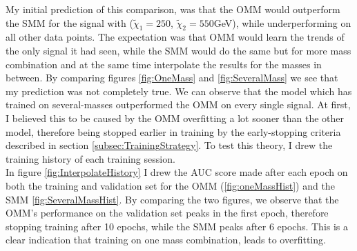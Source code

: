 My initial prediction of this comparison, was that the \ac{OMM} would outperform the \ac{SMM} for the signal with
($\tilde{\chi}_1=250$, $\tilde{\chi}_2=550$GeV), while underperforming on all other data points. The expectation was that \ac{OMM} 
would learn the trends of the only signal it had seen, while the \ac{SMM} would do the same but for more mass combination and 
at the same time interpolate the results for the masses in between. By comparing figures \ref{fig:OneMass} and \ref{fig:SeveralMass} we 
see that my prediction was not completely true. We can observe that the model which has trained on several-masses outperformed the 
\ac{OMM} on every single signal. At first, I believed this to be caused by the \ac{OMM} overfitting a lot sooner than the other 
model, therefore being stopped earlier in training by the early-stopping criteria described in section \ref{subsec:TrainingStrategy}. 
To test this theory, I drew the training history of each training session.
\\
In figure \ref{fig:InterpolateHistory} I drew the \ac{AUC} score made after each epoch on both the training and validation set
for the \ac{OMM} (\ref{fig:oneMassHist}) and the \ac{SMM} \ref{fig:SeveralMassHist}. By comparing the two figures,
we observe that the \ac{OMM}'s performance on the validation set peaks in the first epoch, therefore stopping training after 
10 epochs, while the \ac{SMM} peaks after 6 epochs. This is a clear indication that training on one mass combination, leads 
to overfitting. 
